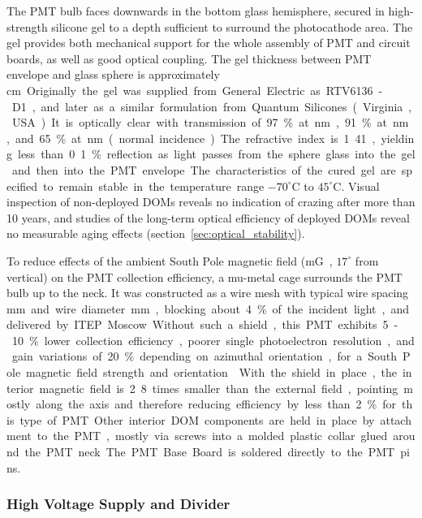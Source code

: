 The PMT bulb faces downwards in the bottom glass hemisphere, secured in high-strength 
silicone gel to a depth sufficient to surround the photocathode area.  
The gel provides both mechanical support for the whole assembly of PMT and circuit boards,
as well as good optical coupling.  
The gel thickness between PMT envelope and glass sphere is approximately \unit[1]cm.  
Originally the gel was supplied from General Electric as RTV6136-D1,
and later as a similar formulation from Quantum Silicones (Virginia, USA).  
It is optically clear with transmission of 97\% at \unit[400]nm, 91\% at \unit[340]nm, and 65\% at \unit[300]nm
(normal incidence).  The refractive index is 1.41, yielding less than 0.1\% reflection as light
passes from the sphere glass into the gel and then into the PMT envelope.
The characteristics of the cured gel are specified to remain stable in the
temperature range $-70^\circ$C to $45^\circ$C.  Visual inspection of
non-deployed DOMs reveals no indication of crazing after more than 10
years, and studies of the long-term optical efficiency of deployed DOMs
reveal no measurable aging effects (section~\ref{sec:optical_stability}).  

To reduce effects of the ambient South Pole magnetic field (\unit[550]mG, $17^\circ$
from vertical) on the PMT collection efficiency, a mu-metal cage surrounds the PMT bulb up to
the neck.  It was constructed as a wire mesh with typical wire spacing \unit[66]mm and
wire diameter \unit[1]mm, blocking about 4\% of the incident light,
and delivered by ITEP Moscow.
Without such a shield, this PMT exhibits 5-10\% lower
collection efficiency, poorer single photoelectron resolution, and gain variations of 20\% depending on 
azimuthal orientation, for a South Pole magnetic field strength and orientation~\cite{calvo}.
With the shield in place, the interior magnetic field is 2.8 times
smaller than the external field, pointing mostly along the axis and therefore reducing efficiency by
less than 2\% for this type of PMT.

Other interior DOM components are held in place by attachment to the PMT, mostly via screws into
a molded plastic collar glued around the PMT neck.  The PMT Base Board is
soldered directly to the PMT pins.

\subsubsection{\label{sec:hv}High Voltage Supply and Divider}

